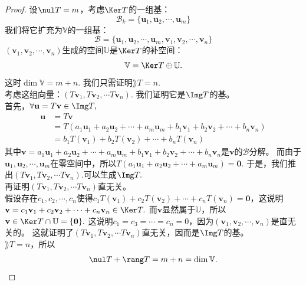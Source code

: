 \documentclass[12pt,UTF8,fontset=none]{ctexbook}
\begin{document}
\begin{proof} %
    设$\nul T = m$，考虑$\Ker T$的一组基：
    $$ \mathcal{B}_k = \{\mathbf{u}_1, \mathbf{u}_2, \cdots, \mathbf{u}_m\}$$
    我们将它扩充为$\mathbb{V}$的一组基：
    $$ \mathcal{B} = \{\mathbf{u}_1, \mathbf{u}_2, \cdots, \mathbf{u}_m, \mathbf{v}_1, \mathbf{v}_2, \cdots, \mathbf{v}_n\}$$
    $(\mathbf{v}_1, \mathbf{v}_2, \cdots, \mathbf{v}_n)$生成的空间$\mathbb{U}$是$\Ker T$的补空间：
    $$ \mathbb{V} = \Ker T \oplus \mathbb{U}.$$
    这时$\dim \mathbb{V} = m+n.$ 我们只需证明$\rang T = n.$\\
    考虑这组向量：$(T\mathbf{v}_1, T\mathbf{v}_2, \cdots T\mathbf{v}_n).$ 
    我们证明它是$\Img T$的基。\\
    首先，$\forall \mathbf{u} = T\mathbf{v} \in \Img T,$
    \begin{align*}
        \mathbf{u} &= T\mathbf{v}  \\
                   &= T(a_1\mathbf{u}_1 + a_2\mathbf{u}_2 + \cdots + a_m\mathbf{u}_m + b_1\mathbf{v}_1 + b_2\mathbf{v}_2 + \cdots + b_n\mathbf{v}_n)  \\
                   &= b_1T(\mathbf{v}_1) + b_2T(\mathbf{v}_2) + \cdots + b_nT(\mathbf{v}_n) 
    \end{align*}
    其中$\mathbf{v} = a_1\mathbf{u}_1 + a_2\mathbf{u}_2 + \cdots + a_m\mathbf{u}_m + b_1\mathbf{v}_1 + b_2\mathbf{v}_2 + \cdots + b_n\mathbf{v}_n$是$\mathbf{v}$的$\mathcal{B}$分解。
    而由于$\mathbf{u}_1, \mathbf{u}_2, \cdots, \mathbf{u}_m$在零空间中，所以$T(a_1\mathbf{u}_1 + a_2\mathbf{u}_2 + \cdots + a_m\mathbf{u}_m) = \mathbf{0}.$
    于是，我们推出$(T\mathbf{v}_1, T\mathbf{v}_2, \cdots T\mathbf{v}_n).$可以生成$\Img T.$\\
    再证明$(T\mathbf{v}_1, T\mathbf{v}_2, \cdots T\mathbf{v}_n)$直无关。\\
    假设存在$c_1, c_2, \cdots, c_n$使得$c_1T(\mathbf{v}_1) + c_2T(\mathbf{v}_2) + \cdots + c_nT(\mathbf{v}_n) = \mathbf{0}$，这说明
    $\mathbf{v} = c_1\mathbf{v}_1 + c_2\mathbf{v}_2 + \cdots + c_n\mathbf{v}_n\in\Ker T.$ 而$\mathbf{v}$显然属于$\mathbb{U}$，所以$\mathbf{v}\in\Ker T \cap \mathbb{U} = \{\mathbf{0}\}.$
    这说明$c_1=c_3=\cdots=c_n=0$，因为$(\mathbf{v}_1, \mathbf{v}_2, \cdots, \mathbf{v}_n)$是直无关的。
    这就证明了$(T\mathbf{v}_1, T\mathbf{v}_2, \cdots T\mathbf{v}_n)$直无关，因而是$\Img T$的基。\\
    $\rang T = n$，所以
    $$ \nul T + \rang T = m + n = \dim \mathbb{V}. $$
\end{proof}
\end{document}
